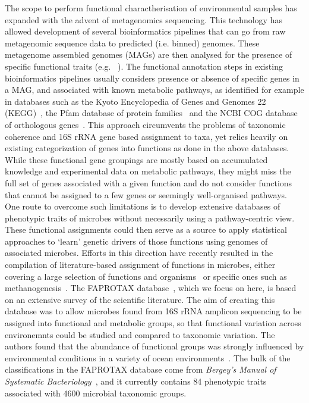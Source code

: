 \documentclass[10pt,letterpaper]{article}
\begin{document}
The scope to perform functional charactherisation of environmental samples has expanded with the advent of metagenomics sequencing. This technology has allowed development of several bioinformatics pipelines that can go from raw metagenomic sequence data to predicted (i.e. binned) genomes. These metagenome assembled genomes (MAGs) are then analysed for the presence of specific functional traits (e.g. ~\cite{Narayanasamy2016}). The functional annotation steps in existing bioinformatics pipelines usually considers presence or absence of specific genes in a MAG, and associated with known metabolic pathways, as identified for example in databases such as the Kyoto
Encyclopedia of Genes and Genomes 22 (KEGG)~\cite{Kanehisa2017}, the Pfam database of protein families~\cite{Finn2016} and the NCBI COG database of orthologous genes~\cite{Tatusov1997}. This approach circumvents the
problems of taxonomic coherence and 16S rRNA gene based assignment to taxa, yet relies heavily on existing categorization of genes into functions as done in the above databases. While these
functional gene groupings are mostly based on accumulated knowledge and experimental
data on metabolic pathways, they might miss the full set of genes associated with a given
function and do not consider functions that cannot be assigned to a few genes or seemingly
well-organised pathways. One route to overcome such limitations is to
develop extensive databases of phenotypic traits of microbes without necessarily using a
pathway-centric view. These functional assignments could then serve as a source to apply
statistical approaches to `learn' genetic drivers of those functions
using genomes of associated microbes. Efforts in this direction have recently resulted in
the compilation of literature-based assignment of functions in microbes, either covering a large selection of functions and organisms~\cite{Louca2016,Louca2017} or specific ones such as methanogenesis~\cite{ukaszewicz2015}. The FAPROTAX database~\cite{Louca2016}, which we focus on here, is based on an extensive survey of the scientific literature. 
The aim of creating this database was to allow microbes found from 16S rRNA amplicon sequencing to be assigned into functional and metabolic groups, so that functional variation across environemnts could be studied and compared to taxonomic variation. The authors found that the abundance of functional groups was strongly influenced by environmental conditions in a variety of ocean environments~\cite{Louca2016a}. The bulk of the classifications in the FAPROTAX database come from \emph{Bergey's Manual of Systematic Bacteriology}~\cite{Whitman}, and it currently contains 84 phenotypic traits associated with 4600 microbial taxonomic groups.
\end{document}
